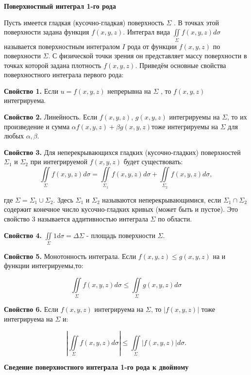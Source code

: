 
\begin{center}
	\textbf{Поверхностный интеграл 1-го рода}
\end{center}

Пусть имеется гладкая (кусочно-гладкая) поверхность $\Sigma$ . В точках этой
поверхности задана функция $f(x,y,z)$. Интеграл вида $\iint\limits_\Sigma f(x,y,z) d\sigma$
называется поверхностным интегралом $I$ рода от функции $f(x,y,z)$ по поверхности
$\Sigma$. С физической точки зрения он представляет массу поверхности в точках
которой задана плотность $f(x,y,z)$.
Приведём основные свойства поверхностного интеграла первого рода:

\par\bigskip

\textbf{Свойство 1.} Если $u=f(x,y,z)$ непрерывна на $\Sigma$ , то $f(x,y,z)$ интегрируема.
\par\bigskip
\textbf{Свойство 2.} Линейность. Если $f(x,y,z)$, $g(x,y,z)$ интегрируемы на
$\Sigma$, то их произведение и сумма $\alpha f(x,y,z) + \beta g(x,y,z)$тоже интегрируемы на
$\Sigma$ для любых $\alpha, \beta$.
\par\bigskip
\textbf{Свойство 3.} Для неперекрывающихся гладких (кусочно-гладких) поверхностей $\Sigma_1$ и $\Sigma_2$ при интегрируемой $f(x,y,z)$ будет существовать:
$$\iint\limits_\Sigma f(x,y,z) d\sigma = \iint\limits_{\Sigma_1} f(x,y,z) d\sigma + \iint\limits_{\Sigma_2} f(x,y,z) d\sigma,$$

где $\Sigma=\Sigma_1 \cup \Sigma_2$. Здесь $\Sigma_1$ и $\Sigma_2$ называются неперекрывающимися, если $\Sigma_1 \cap \Sigma_2$ содержит конечное число кусочно-гладких кривых (может быть и пустое). Это свойство 3 называется аддитивностью интеграла $\Sigma$ по области.
\par\bigskip
\textbf{Свойство 4.}  $\iint\limits_\Sigma 1 d\sigma = \Delta\Sigma$ - площадь поверхности $\Sigma$.
\par\bigskip
\textbf{Свойство 5.} Монотонность интеграла. Если $f(x,y,z) \leq g(x,y,z)$ на и функции интегрируемы,то:

$$\iint\limits_\Sigma f(x,y,z) d\sigma \leq \iint\limits_\Sigma g(x,y,z) d\sigma $$

\textbf{Свойство 6.} Если $f(x,y,z)$ интегрируема на $\Sigma$, то $|f(x,y,z)|$ тоже интегрируема на $\Sigma$ и:

$$\left| \iint\limits_\Sigma f(x,y,z) d\sigma\right| \leq \iint\limits_\Sigma |f(x,y,z)| d\sigma. $$

\begin{center}
	\textbf{Сведение поверхностного интеграла 1-го рода к двойному}
\end{center}

